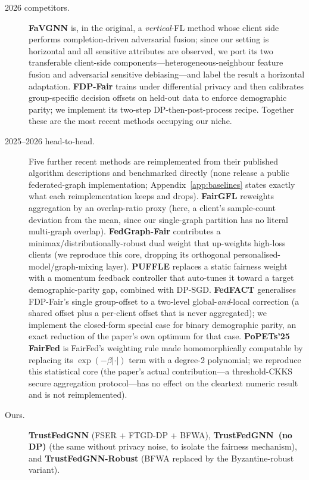 \documentclass[pdflatex,sn-mathphys-num]{sn-jnl}
\theoremstyle{thmstyleone}%
\theoremstyle{thmstyletwo}%
\theoremstyle{thmstylethree}%
\begin{document}
\begin{description}
\item[2026 competitors.] \textbf{FaVGNN} \cite{wang2026favgnn} is, in the
original, a \emph{vertical}-FL method whose client side performs
completion-driven adversarial fusion; since our setting is horizontal and all
sensitive attributes are observed, we port its two transferable client-side
components---heterogeneous-neighbour feature fusion and adversarial sensitive
debiasing---and label the result a horizontal adaptation. \textbf{FDP-Fair}
\cite{xue2026fdpfair} trains under differential privacy and then calibrates
group-specific decision offsets on held-out data to enforce demographic parity;
we implement its two-step DP-then-post-process recipe. Together these are the
most recent methods occupying our niche.

\item[2025--2026 head-to-head.] Five further recent methods are reimplemented
from their published algorithm descriptions and benchmarked directly (none
release a public federated-graph implementation; Appendix~\ref{app:baselines}
states exactly what each reimplementation keeps and drops). \textbf{FairGFL}
\cite{fairgfl2026} reweights aggregation by an overlap-ratio proxy (here, a
client's sample-count deviation from the mean, since our single-graph
partition has no literal multi-graph overlap). \textbf{FedGraph-Fair}
\cite{fedgraphfair2026} contributes a minimax/distributionally-robust dual
weight that up-weights high-loss clients (we reproduce this core, dropping its
orthogonal personalised-model/graph-mixing layer). \textbf{PUFFLE}
\cite{corbucci2024puffle} replaces a static fairness weight with a momentum
feedback controller that auto-tunes it toward a target demographic-parity
gap, combined with DP-SGD. \textbf{FedFACT} \cite{fedfact2025} generalises
FDP-Fair's single group-offset to a two-level global-\emph{and}-local
correction (a shared offset plus a per-client offset that is never
aggregated); we implement the closed-form special case for binary
demographic parity, an exact reduction of the paper's own optimum for that
case. \textbf{PoPETs'25 FairFed} \cite{bendoukha2025popets} is FairFed's
weighting rule made homomorphically computable by replacing its
$\exp(-\beta|\cdot|)$ term with a degree-2 polynomial; we reproduce this
statistical core (the paper's actual contribution---a threshold-CKKS secure
aggregation protocol---has no effect on the cleartext numeric result and is
not reimplemented).

\item[Ours.] \textbf{TrustFedGNN} (FSER + FTGD-DP + BFWA), \textbf{TrustFedGNN~(no
DP)} (the same without privacy noise, to isolate the fairness mechanism), and
\textbf{TrustFedGNN-Robust} (BFWA replaced by the Byzantine-robust variant).
\end{description}
\end{document}
